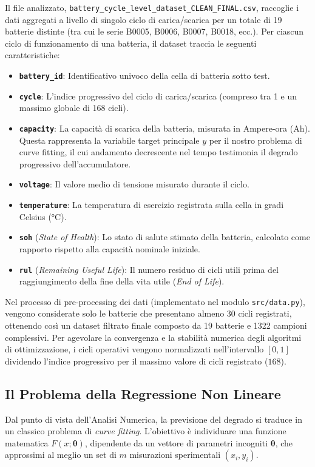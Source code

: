\documentclass[11pt, a4paper]{article}
\begin{document}
Il file analizzato, \texttt{battery\_cycle\_level\_dataset\_CLEAN\_FINAL.csv}, raccoglie i dati aggregati a livello di singolo ciclo di carica/scarica per un totale di 19 batterie distinte (tra cui le serie B0005, B0006, B0007, B0018, ecc.). Per ciascun ciclo di funzionamento di una batteria, il dataset traccia le seguenti caratteristiche:
\begin{itemize}
    \item \textbf{\texttt{battery\_id}}: Identificativo univoco della cella di batteria sotto test.
    \item \textbf{\texttt{cycle}}: L'indice progressivo del ciclo di carica/scarica (compreso tra 1 e un massimo globale di 168 cicli).
    \item \textbf{\texttt{capacity}}: La capacità di scarica della batteria, misurata in Ampere-ora (Ah). Questa rappresenta la variabile target principale $y$ per il nostro problema di curve fitting, il cui andamento decrescente nel tempo testimonia il degrado progressivo dell'accumulatore.
    \item \textbf{\texttt{voltage}}: Il valore medio di tensione misurato durante il ciclo.
    \item \textbf{\texttt{temperature}}: La temperatura di esercizio registrata sulla cella in gradi Celsius (°C).
    \item \textbf{\texttt{soh}} (\textit{State of Health}): Lo stato di salute stimato della batteria, calcolato come rapporto rispetto alla capacità nominale iniziale.
    \item \textbf{\texttt{rul}} (\textit{Remaining Useful Life}): Il numero residuo di cicli utili prima del raggiungimento della fine della vita utile (\textit{End of Life}).
\end{itemize}

Nel processo di pre-processing dei dati (implementato nel modulo \texttt{src/data.py}), vengono considerate solo le batterie che presentano almeno 30 cicli registrati, ottenendo così un dataset filtrato finale composto da 19 batterie e 1322 campioni complessivi. Per agevolare la convergenza e la stabilità numerica degli algoritmi di ottimizzazione, i cicli operativi vengono normalizzati nell'intervallo $[0, 1]$ dividendo l'indice progressivo per il massimo valore di cicli registrato ($168$).

\subsection{Il Problema della Regressione Non Lineare}
Dal punto di vista dell'Analisi Numerica, la previsione del degrado si traduce in un classico problema di \textit{curve fitting}. L'obiettivo è individuare una funzione matematica $F(x; \boldsymbol{\theta})$, dipendente da un vettore di parametri incogniti $\boldsymbol{\theta}$, che approssimi al meglio un set di $m$ misurazioni sperimentali $(x_i, y_i)$. 
\end{document}
